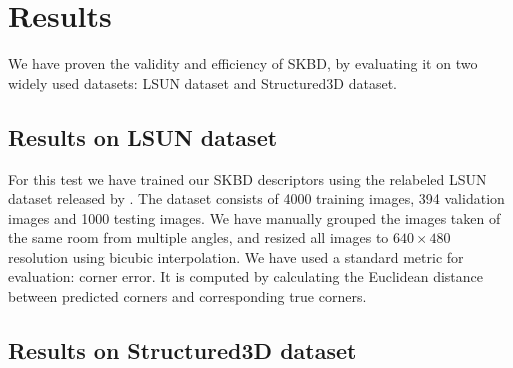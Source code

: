 \section{Results}
\label{sec:results}
We have proven the validity and efficiency of SKBD, by evaluating it on two widely used datasets: LSUN dataset\cite{zhang2015large} and Structured3D dataset\cite{zheng2020structured3d}.

\subsection{Results on LSUN dataset}
For this test we have trained our SKBD descriptors using the relabeled LSUN dataset released by \cite{ren2017coarse}. The dataset consists of 4000 training images, 394 validation images and 1000 testing images. We have manually grouped the images taken of the same room from multiple angles, and resized all images to \( 640 \times 480 \) resolution using bicubic interpolation. We have used a standard metric for evaluation: corner error. It is computed by calculating the Euclidean distance between predicted corners and corresponding true corners.


\subsection{Results on Structured3D dataset}